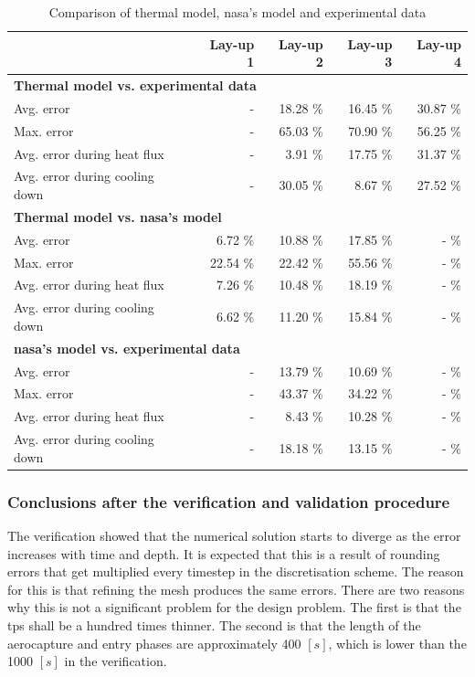 \begin{table}[h]
	\centering
	\caption{Comparison of thermal model, \acrshort{nasa}'s model and experimental data}
	\begin{tabular}{|p{5.6cm}|rrrr|}
		\hline
		\textbf{} & \textbf{Lay-up 1} & \textbf{Lay-up 2} & \textbf{Lay-up 3} & \textbf{Lay-up 4} \\ \hline \hline
		\multicolumn{5}{|l|}{\textbf{Thermal model vs. experimental data}}			\\ \hline	
		Avg. error											&        - & 18.28 \% & 16.45 \% & 30.87 \% \\
		Max. error											&        - & 65.03 \% & 70.90 \% & 56.25 \% \\
		Avg. error during heat flux							&        - &  3.91 \% & 17.75 \% & 31.37 \% \\
		Avg. error during cooling down						&        - & 30.05 \% &  8.67 \% & 27.52 \% \\ \hline
		\multicolumn{5}{|l|}{\textbf{Thermal model vs. \gls{nasa}'s model}}			\\ \hline		
		Avg. error											&  6.72 \% & 10.88 \% & 17.85 \% &     - \% \\
		Max. error											& 22.54 \% & 22.42 \% & 55.56 \% &     - \% \\
		Avg. error during heat flux							&  7.26 \% & 10.48 \% & 18.19 \% &     - \% \\
		Avg. error during cooling down						&  6.62 \% & 11.20 \% & 15.84 \% &     - \% \\ \hline
		\multicolumn{5}{|l|}{\textbf{\gls{nasa}'s model vs. experimental data}}			\\ \hline		
		Avg. error											&        - & 13.79 \% & 10.69 \% &     - \% \\
		Max. error											&        - & 43.37 \% & 34.22 \% &     - \% \\
		Avg. error during heat flux							&        - &  8.43 \% & 10.28 \% &     - \% \\
		Avg. error during cooling down						&        - & 18.18 \% & 13.15 \% &     - \% \\ \hline
	\end{tabular}
	\label{tab:valerrorthermo}
\end{table}


\subsubsection{Conclusions after the verification and validation procedure}
The verification showed that the numerical solution starts to diverge as the error increases with time and depth. It is expected that this is a result of rounding errors that get multiplied every timestep in the discretisation scheme. The reason for this is that refining the mesh produces the same errors. There are two reasons why this is not a significant problem for the design problem. The first is that the \gls{tps} shall be a hundred times thinner. The second is that the length of the aerocapture and entry phases are approximately 400 $\left[s\right]$, which is lower than the 1000 $\left[s\right]$ in the verification. 
 
